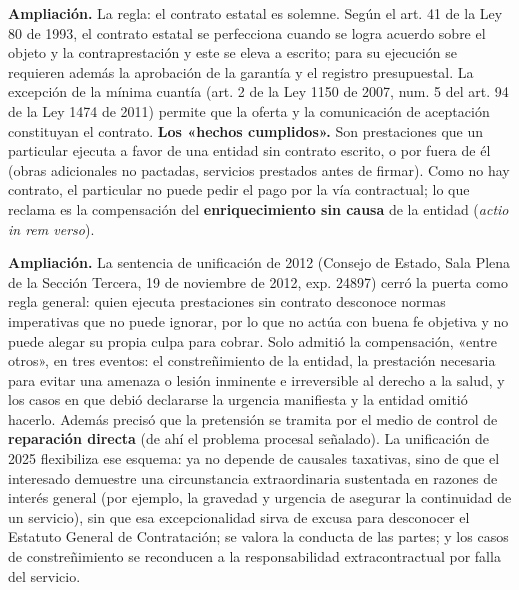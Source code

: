 \begin{ampliacion}
\textcolor[HTML]{5B3F8C}{\textbf{Ampliación. }}La regla: el contrato estatal es solemne. Según el art. 41 de la Ley 80 de 1993, el contrato estatal se perfecciona cuando se logra acuerdo sobre el objeto y la contraprestación y este se eleva a escrito; para su ejecución se requieren además la aprobación de la garantía y el registro presupuestal. La excepción de la mínima cuantía (art. 2 de la Ley 1150 de 2007, num. 5 del art. 94 de la Ley 1474 de 2011) permite que la oferta y la comunicación de aceptación constituyan el contrato. \textbf{Los «hechos cumplidos».} Son prestaciones que un particular ejecuta a favor de una entidad sin contrato escrito, o por fuera de él (obras adicionales no pactadas, servicios prestados antes de firmar). Como no hay contrato, el particular no puede pedir el pago por la vía contractual; lo que reclama es la compensación del \textbf{enriquecimiento sin causa} de la entidad (\textit{actio in rem verso}).
\par
\textcolor[HTML]{5B3F8C}{\textbf{Ampliación. }}La sentencia de unificación de 2012 (Consejo de Estado, Sala Plena de la Sección Tercera, 19 de noviembre de 2012, exp. 24897) cerró la puerta como regla general: quien ejecuta prestaciones sin contrato desconoce normas imperativas que no puede ignorar, por lo que no actúa con buena fe objetiva y no puede alegar su propia culpa para cobrar. Solo admitió la compensación, «entre otros», en tres eventos: el constreñimiento de la entidad, la prestación necesaria para evitar una amenaza o lesión inminente e irreversible al derecho a la salud, y los casos en que debió declararse la urgencia manifiesta y la entidad omitió hacerlo. Además precisó que la pretensión se tramita por el medio de control de \textbf{reparación directa} (de ahí el problema procesal señalado). La unificación de 2025 flexibiliza ese esquema: ya no depende de causales taxativas, sino de que el interesado demuestre una circunstancia extraordinaria sustentada en razones de interés general (por ejemplo, la gravedad y urgencia de asegurar la continuidad de un servicio), sin que esa excepcionalidad sirva de excusa para desconocer el Estatuto General de Contratación; se valora la conducta de las partes; y los casos de constreñimiento se reconducen a la responsabilidad extracontractual por falla del servicio.
\end{ampliacion}
